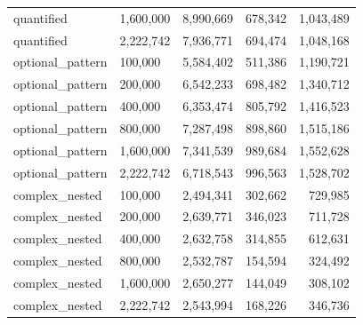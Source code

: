 {\begin{longtable}{>{\ttfamily}llrrr}
quantified & 1{,}600{,}000 & 8{,}990{,}669 & 678{,}342 & 1{,}043{,}489 \\
quantified & 2{,}222{,}742 & 7{,}936{,}771 & 694{,}474 & 1{,}048{,}168 \\
\midrule
optional\_pattern & 100{,}000 & 5{,}584{,}402 & 511{,}386 & 1{,}190{,}721 \\
optional\_pattern & 200{,}000 & 6{,}542{,}233 & 698{,}482 & 1{,}340{,}712 \\
optional\_pattern & 400{,}000 & 6{,}353{,}474 & 805{,}792 & 1{,}416{,}523 \\
optional\_pattern & 800{,}000 & 7{,}287{,}498 & 898{,}860 & 1{,}515{,}186 \\
optional\_pattern & 1{,}600{,}000 & 7{,}341{,}539 & 989{,}684 & 1{,}552{,}628 \\
optional\_pattern & 2{,}222{,}742 & 6{,}718{,}543 & 996{,}563 & 1{,}528{,}702 \\
\midrule
complex\_nested & 100{,}000 & 2{,}494{,}341 & 302{,}662 & 729{,}985 \\
complex\_nested & 200{,}000 & 2{,}639{,}771 & 346{,}023 & 711{,}728 \\
complex\_nested & 400{,}000 & 2{,}632{,}758 & 314{,}855 & 612{,}631 \\
complex\_nested & 800{,}000 & 2{,}532{,}787 & 154{,}594 & 324{,}492 \\
complex\_nested & 1{,}600{,}000 & 2{,}650{,}277 & 144{,}049 & 308{,}102 \\
complex\_nested & 2{,}222{,}742 & 2{,}543{,}994 & 168{,}226 & 346{,}736 \\
\end{longtable}
}

